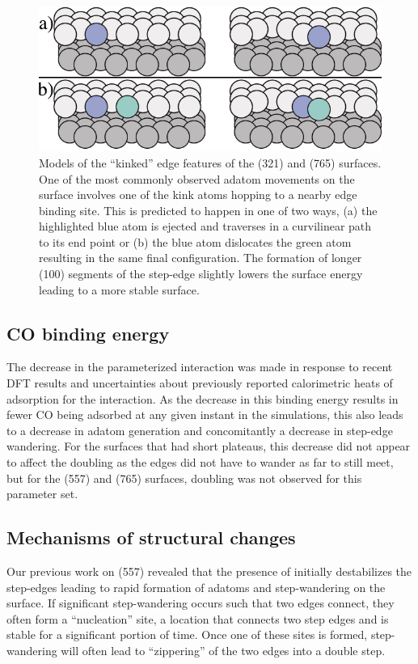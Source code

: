 \begin{figure}
  \includegraphics[width=\linewidth]{../figures/chap4/kinkMovement.pdf}
  \caption{Models of the ``kinked'' edge features of the (321) and (765)
surfaces.  One of the most commonly observed adatom movements on the surface
involves one of the kink atoms hopping to a nearby edge binding site. This is
predicted to happen in one of two ways, (a) the highlighted blue atom is
ejected and traverses in a curvilinear path to its end point or (b) the blue
atom dislocates the green atom resulting in the same final configuration. The
formation of longer (100) segments of the step-edge slightly lowers the surface
energy leading to a more stable surface.}
  \label{fig:kinkSketch}
\end{figure}

\subsection{CO binding energy}
The decrease in the parameterized  interaction was made in
response to recent DFT results\citep{Deshlahra:2012aa} and uncertainties about
previously reported calorimetric heats of adsorption for the 
interaction.\citep{Yeo:1997th} As the decrease in this binding energy results
in fewer CO being adsorbed at any given instant in the simulations, this also
leads to a decrease in adatom generation and concomitantly a decrease in
step-edge wandering. For the surfaces that had short plateaus, this decrease
did not appear to affect the doubling as the edges did not have to wander as
far to still meet, but for the (557) and (765) surfaces,  doubling was not
observed for this parameter set.

\subsection{Mechanisms of structural changes}
Our previous work on  (557) revealed that the presence of  initially
destabilizes the step-edges leading to rapid formation of adatoms and
step-wandering on the surface. If significant step-wandering occurs such that
two edges connect, they often form a ``nucleation'' site, a location that
connects two step edges and is stable for a significant portion of time. Once
one of these sites is formed, step-wandering will often lead to ``zippering''
of the two edges into a double step. 

